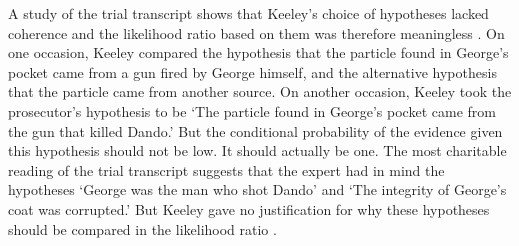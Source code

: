 \documentclass{article}
\begin{document}

A study of the trial transcript shows that Keeley's choice of hypotheses lacked coherence and the likelihood ratio based on them was therefore meaningless \citep{fenton2014WhenNeutralEvidence}. 
%
%
%
On one occasion, Keeley compared the hypothesis that the particle found in George's pocket came from a gun fired by George himself, and the alternative hypothesis that the particle came from another source. 
On another occasion, Keeley took the prosecutor's hypothesis to be `The particle found in George's pocket came from the gun that killed Dando.' 
But the  conditional probability of the evidence given this hypothesis should not be low. It should actually be one. 
%
The most charitable reading of the trial transcript   suggests that the expert had in mind the hypotheses 
 `George was the man who shot Dando' and  `The integrity of George's coat was corrupted.' But 
Keeley gave no justification  for why these hypotheses should be compared in the 
 likelihood ratio \citep[see][for details]{fenton2014WhenNeutralEvidence}.
 
\end{document}
